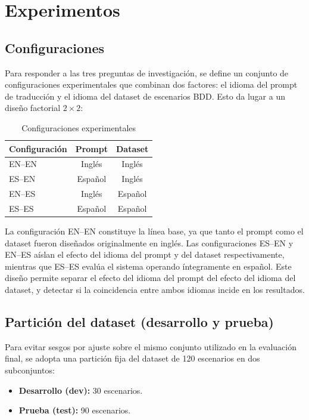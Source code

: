 \section{Experimentos}
\label{sec:experimentos}

\subsection{Configuraciones}

Para responder a las tres preguntas de investigación, se define un conjunto de configuraciones experimentales que combinan dos factores: el idioma del prompt de traducción y el idioma del dataset de escenarios BDD. Esto da lugar a un diseño factorial $2 \times 2$:

\begin{table}[htbp]
\centering
\caption{Configuraciones experimentales}
\label{tab:configuraciones}
\begin{tabular}{lcc}
\hline
\textbf{Configuración} & \textbf{Prompt} & \textbf{Dataset} \\
\hline
EN--EN & Inglés  & Inglés  \\
ES--EN & Español & Inglés  \\
EN--ES & Inglés  & Español \\
ES--ES & Español & Español \\
\hline
\end{tabular}
\end{table}

La configuración EN--EN constituye la línea base, ya que tanto el prompt como el dataset fueron diseñados originalmente en inglés. Las configuraciones ES--EN y EN--ES aíslan el efecto del idioma del prompt y del dataset respectivamente, mientras que ES--ES evalúa el sistema operando íntegramente en español. Este diseño permite separar el efecto del idioma del prompt del efecto del idioma del dataset, y detectar si la coincidencia entre ambos idiomas incide en los resultados.

\subsection{Partición del dataset (desarrollo y prueba)}

Para evitar sesgos por ajuste sobre el mismo conjunto utilizado en la evaluación final, se adopta una partición fija del dataset de 120 escenarios en dos subconjuntos:

\begin{itemize}
  \item \textbf{Desarrollo (dev):} 30 escenarios.
  \item \textbf{Prueba (test):} 90 escenarios.
\end{itemize}

